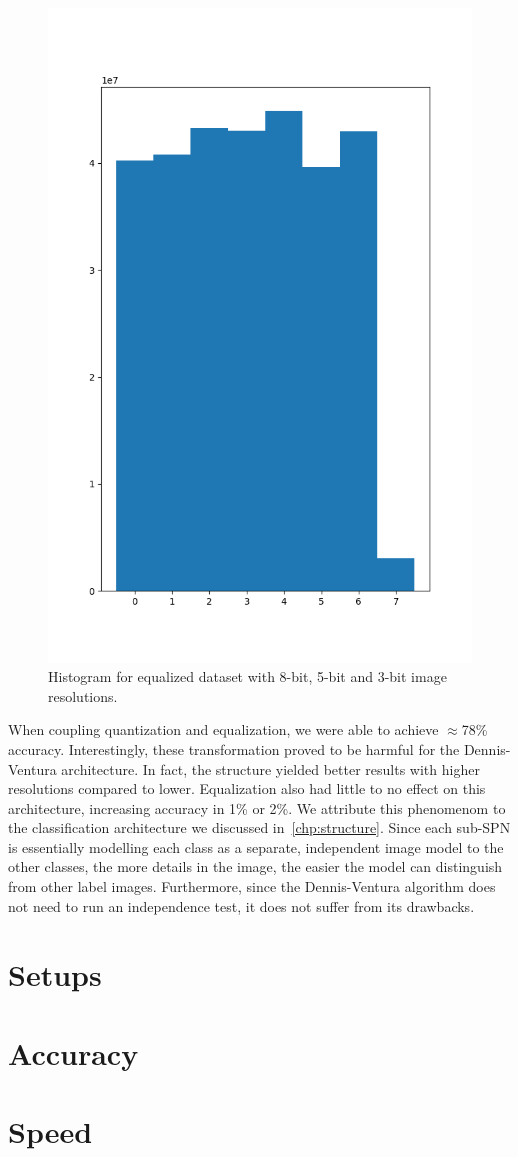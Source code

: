 \begin{figure}[h]
  \includegraphics[scale=0.3]{imgs/hist_3_eq.png}
  \caption{Histogram for equalized dataset with 8-bit, 5-bit and 3-bit image
  resolutions.\label{fig:hist-eq}}
\end{figure}

When coupling quantization and equalization, we were able to achieve $\approx$78\% accuracy.
Interestingly, these transformation proved to be harmful for the Dennis-Ventura architecture. In
fact, the structure yielded better results with higher resolutions compared to lower. Equalization
also had little to no effect on this architecture, increasing accuracy in 1\% or 2\%. We attribute
this phenomenom to the classification architecture we discussed in~\autoref{chp:structure}. Since
each sub-SPN is essentially modelling each class as a separate, independent image model to the
other classes, the more details in the image, the easier the model can distinguish from other label
images. Furthermore, since the Dennis-Ventura algorithm does not need to run an independence test,
it does not suffer from its drawbacks.

\section{Setups}

\section{Accuracy}

\section{Speed}
